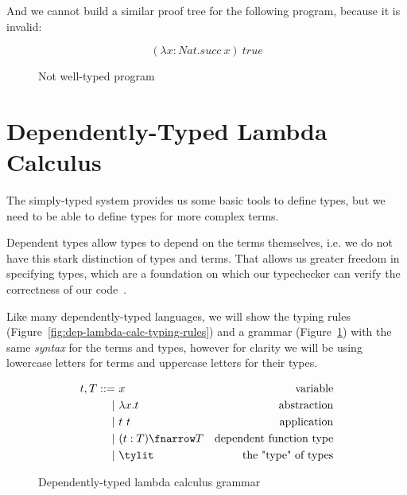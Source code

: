 And we cannot build a similar proof tree for the following program, because it is invalid:

\begin{figure}[H]
       $$ (\lambda x : Nat . succ\ x)\ true $$
       \caption{Not well-typed program}
\end{figure}

\section{Dependently-Typed Lambda Calculus}\label{dep-types}

The simply-typed system provides us some basic tools to define types, but we need to be able to define types for more complex terms.

Dependent types allow types to depend on the terms themselves, i.e. we do not have this stark distinction of types and terms. That allows us greater freedom in specifying types, which are a foundation on which our typechecker can verify the correctness of our code~\cite{advancedtapl}.

Like many dependently-typed languages, we will show the typing rules (Figure~\ref{fig:dep-lambda-calc-typing-rules}) and a grammar (Figure~\ref{fig:dep-lambda-calc-grammar}) with the same \emph{syntax} for the terms and types, however for clarity we will be using lowercase letters for terms and uppercase letters for their types.

\begin{figure}[H]
       \[
              \begin{aligned}
                     t, T ::= & \ x                  & \text{variable}                \\
                     |        & \  \lambda x.t       & \text{abstraction}             \\
                     |        & \  t\ t              & \text{application}             \\
                     |        & \ (t : T) \fnarrow T & \text{dependent function type} \\
                     |        & \ \tylit             & \text{the "type" of types}
              \end{aligned}
       \]
       \caption{Dependently-typed lambda calculus grammar}
       \label{fig:dep-lambda-calc-grammar}
\end{figure}

